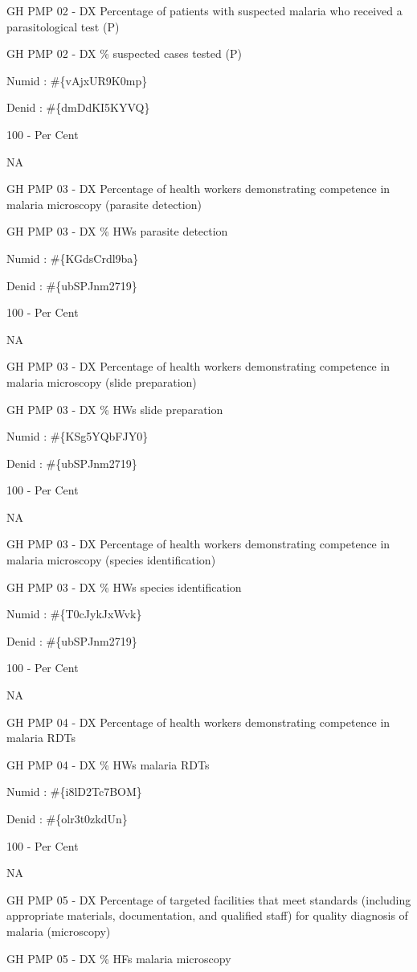 \documentclass[]{book}
\begin{document}
GH PMP 02 - DX Percentage of patients with suspected malaria who received a parasitological test (P)

GH PMP 02 - DX \% suspected cases tested (P)

Numid : \#\{vAjxUR9K0mp\}

Denid : \#\{dmDdKI5KYVQ\}

100 - Per Cent

NA

GH PMP 03 - DX Percentage of health workers demonstrating competence in malaria microscopy (parasite detection)

GH PMP 03 - DX \% HWs parasite detection

Numid : \#\{KGdsCrdl9ba\}

Denid : \#\{ubSPJnm2719\}

100 - Per Cent

NA

GH PMP 03 - DX Percentage of health workers demonstrating competence in malaria microscopy (slide preparation)

GH PMP 03 - DX \% HWs slide preparation

Numid : \#\{KSg5YQbFJY0\}

Denid : \#\{ubSPJnm2719\}

100 - Per Cent

NA

GH PMP 03 - DX Percentage of health workers demonstrating competence in malaria microscopy (species identification)

GH PMP 03 - DX \% HWs species identification

Numid : \#\{T0cJykJxWvk\}

Denid : \#\{ubSPJnm2719\}

100 - Per Cent

NA

GH PMP 04 - DX Percentage of health workers demonstrating competence in malaria RDTs

GH PMP 04 - DX \% HWs malaria RDTs

Numid : \#\{i8lD2Tc7BOM\}

Denid : \#\{olr3t0zkdUn\}

100 - Per Cent

NA

GH PMP 05 - DX Percentage of targeted facilities that meet standards (including appropriate materials, documentation, and qualified staff) for quality diagnosis of malaria (microscopy)

GH PMP 05 - DX \% HFs malaria microscopy
\end{document}
